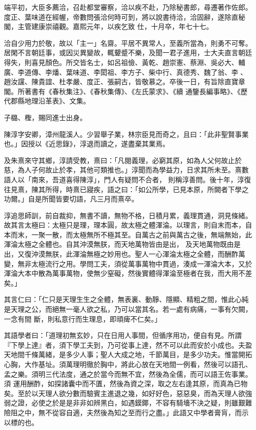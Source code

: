 \begin{pinyinscope}
 端平初，大臣多薦洽，召赴都堂審察，洽以疾不赴，乃除秘書郎，尋遷著作佐郎。度正、葉味道在經幄，帝數問張洽何時可到，將以說書待洽，洽固辭，遂除直秘閣，主管建康崇禧觀。嘉熙元年，以疾乞致
 仕，十月卒，年七十七。



 洽自少用力於敬，故以「主一」名齋。平居不異常人，至義所當為，則勇不可奪。居閑不言朝廷事，或因災異變故，輒顰蹙不樂，及聞一君子進用，士大夫直言朝廷得失，則喜見顏色。所交皆名士，如呂祖儉、黃乾、趙崇憲、蔡淵、吳必大、輔廣、李道傳、李燔、葉味道、李閎祖、李方子、柴中行、真德秀、魏了翁、李𡌴、趙汝讜、陳貴誼、杜孝嚴、度正、張嗣古，皆敬慕之。卒後一日，有旨除直寶章閣。所著書有《春秋集注》、《春秋集傳》、《左氏蒙求》、《續
 通鑒長編事略》、《歷代郡縣地理沿革表》、文集。



 子㯝、檉，賜同進士出身。



 陳淳字安卿，漳州龍溪人。少習舉子業，林宗臣見而奇之，且曰：「此非聖賢事業也。」因授以《近思錄》，淳退而讀之，遂盡棄其業焉。



 及朱熹來守其鄉，淳請受教，熹曰：「凡閱義理，必窮其原，如為人父何故止於慈，為人子何故止於孝，其他可類推也。」淳聞而為學益力，日求其所未至。熹數語人以「南來，吾道喜得陳淳」，門人有疑問不合者，
 則稱淳善問。後十年，淳復往見熹，陳其所得，時熹已寢疾，語之曰：「如公所學，已見本原，所闕者下學之功爾。」自是所聞皆要切語，凡三月而熹卒。



 淳追思師訓，前自裁抑，無書不讀，無物不格，日積月累，義理貫通，洞見條緒。故其言太極曰：太極只是理，理本圓，故太極之體渾淪。以理言，則自末而本，自本而末，一聚一散，而太極無所不極其至。自萬古之前與萬古之後，無端無始，此渾淪太極之全體也。自其沖漠無朕，而天地萬物皆由是出，
 及天地萬物既由是出，又復沖漠無朕，此渾淪無極之妙用也。聖人一心渾淪太極之全體，而酬酢萬變，無非太極流行之用。學問工夫，須從萬事萬物中貫過，湊成一渾淪大本，又於渾淪大本中散為萬事萬物，使無少窒礙，然後實體得渾淪至極者在我，而大用不差矣。」



 其言仁曰：「仁只是天理生生之全體，無表裏、動靜、隱顯、精粗之間，惟此心純是天理之公，而絕無一毫人欲之私，乃可以當其名。若一處有病痛，一事有欠闕，一念有間
 斷，則私意行而生理息，即頑痺不仁矣。」



 其語學者曰：「道理初無玄妙，只在日用人事間，但循序用功，便自有見。所謂『下學上達』者，須下學工夫到，乃可從事上達，然不可以此而安於小成也。夫盈天地間千條萬緒，是多少人事；聖人大成之地，千節萬目，是多少功夫。惟當開拓心胸，大作基址。須萬理明徹於胸中，將此心放在天地間一例看，然後可以語孔、孟之樂。須明三代法度，通之於當今而無不宜，然後為全儒，而可以語王佐事業。須
 運用酬酢，如探諸囊中而不匱，然後為資之深，取之左右逢其原，而真為已物矣。至於以天理人欲分數而驗賓主進退之幾，如好好色，惡惡臭，而為天理人欲強弱之證，必使之於是是非非如辨黑白，如遇鏌鎁，不容有騎墻不決之疑，則雖艱難險阻之中，無不從容自適，夫然後為知之至而行之盡。」此語又中學者膏肓，而示以標的也。




\end{pinyinscope}
